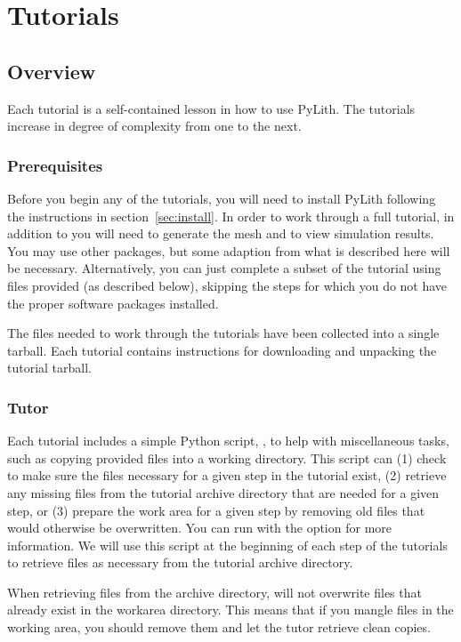 \chapter{Tutorials}

\section{Overview}

Each tutorial is a self-contained lesson in how to use PyLith. The
tutorials increase in degree of complexity from one to the next. 

\subsection{Prerequisites}

Before you begin any of the tutorials, you will need to install PyLith
following the instructions in section~\ref{sec:install}. In order to
work through a full tutorial, in addition to  you
will need 
to generate the mesh and  to
view simulation results. You may use other packages, but some adaption
from what is described here will be necessary. Alternatively, you can
just complete a subset of the tutorial using files provided (as
described below), skipping the steps for which you do not have the
proper software packages installed.

The files needed to work through the tutorials have been collected
into a single tarball. Each tutorial contains instructions for
downloading and unpacking the tutorial tarball.

\subsection{Tutor}

Each tutorial includes a simple Python script, , to
help with miscellaneous tasks, such as copying provided files into a
working directory. This script can (1) check to make sure the files
necessary for a given step in the tutorial exist, (2) retrieve any
missing files from the tutorial archive directory that are needed for
a given step, or (3) prepare the work area for a given step by
removing old files that would otherwise be overwritten. You can run
 with the  option for more
information. We will use this script at the beginning of each step of
the tutorials to retrieve files as necessary from the tutorial archive
directory.

\begin{tip}
  When retrieving files from the archive directory, 
  will not overwrite files that already exist in the workarea
  directory. This means that if you mangle files in the working area,
  you should remove them and let the tutor retrieve clean copies.
\end{tip}



